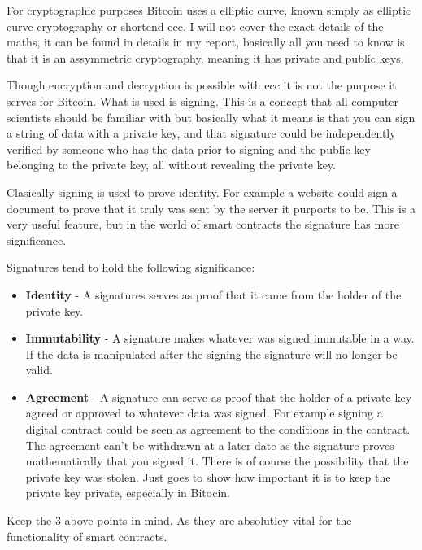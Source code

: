 For cryptographic purposes Bitcoin uses a elliptic curve, known simply as elliptic curve 
cryptography or shortend ecc. I will not cover the exact details of the maths, it can 
be found in details in my report, basically all you need to know is that it is an
assymmetric cryptography, meaning it has private and public keys.
 
Though encryption and decryption is possible with ecc it is not the purpose it serves 
for Bitcoin. What is used is signing. This is a concept that all computer scientists
should be familiar with but basically what it means is that you can sign a string
of data with a private key, and that signature could be independently verified by someone who
has the data prior to signing and the public key belonging to the private key, all
without revealing the private key.

Clasically signing is used to prove identity. For example a website could sign
a document to prove that it truly was sent by the server it purports to be.
This is a very useful feature, but in the world of smart contracts the signature
has more significance.

Signatures tend to hold the following significance:

\begin{itemize}
\item \textbf{Identity} - A signatures serves as proof that it came from the holder
of the private key. 
\item \textbf{Immutability} - A signature makes whatever was signed immutable in a way.
If the data is manipulated after the signing the signature will no longer be valid.
\item \textbf{Agreement} - A signature can serve as proof that the holder of a private 
key agreed or approved to whatever data was signed. For example signing a digital
contract could be seen as agreement to the conditions in the contract. The agreement
can't be withdrawn at a later date as the signature proves mathematically that you 
signed it. There is of course the possibility that the private key was stolen. Just
goes to show how important it is to keep the private key private, especially in
Bitocin.
\end{itemize}

Keep the 3 above points in mind. As they are absolutley vital for the functionality 
of smart contracts.   
